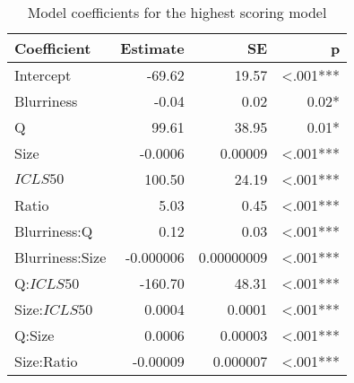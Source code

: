 \documentclass[12pt]{article}
\begin{document}
\begin{table}[ht]
	\caption{Model coefficients for the highest scoring model}
	\begin{center}
	\begin{tabular}{lrrr}
		\toprule
		Coefficient & Estimate & SE & p \\ 
		\midrule
		Intercept & -69.62 & 19.57 & \textless .001***\\
		Blurriness & -0.04 & 0.02 & 0.02*\\
		Q & 99.61 & 38.95 &  0.01*\\
		Size & -0.0006 & 0.00009 & \textless .001***\\
		$ICLS50$ & 100.50 & 24.19 & \textless .001***\\
		Ratio & 5.03 & 0.45 & \textless .001***\\
		Blurriness:Q & 0.12 & 0.03 & \textless .001***\\
		Blurriness:Size & -0.000006 & 0.00000009 & \textless .001***\\
		Q:$ICLS50$ & -160.70 & 48.31 & \textless .001*** \\
		Size:$ICLS50$ &  0.0004 & 0.0001 & \textless .001***\\
		Q:Size &  0.0006 & 0.00003 &  \textless .001*** \\
		Size:Ratio & -0.00009 & 0.000007 & \textless .001*** \\ 
		\bottomrule
	\end{tabular}
	\end{center}
	\label{tab:CVtopmodel}
\end{table}
\end{document}
